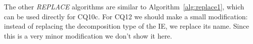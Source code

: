 The other \emph{REPLACE} algorithms are similar to Algorithm~\ref{alg:replace1}, which can be used directly for CQ10c. For CQ12 we should make a small modification: instead of replacing the decomposition type of the IE, we replace its name. Since this is a very minor modification we don't show it here.